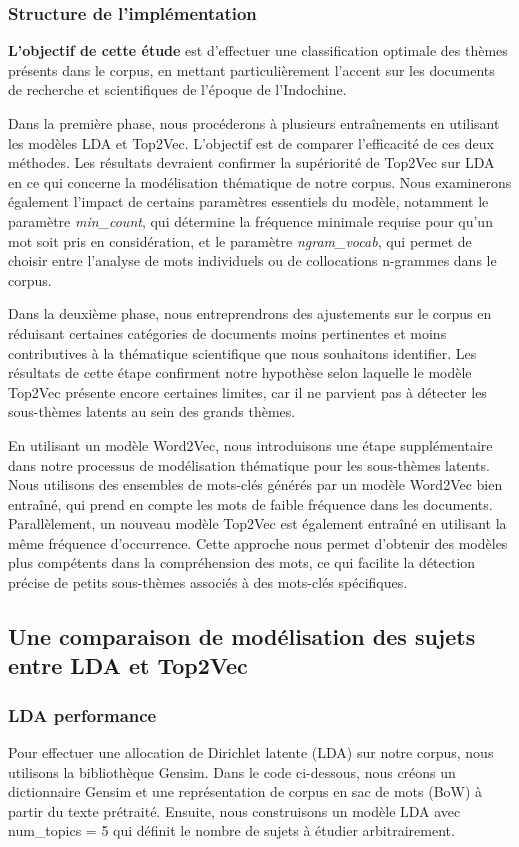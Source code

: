 \subsubsection{Structure de l'implémentation}
\textbf{L'objectif de cette étude} est d'effectuer une classification optimale des thèmes présents dans le corpus, en mettant particulièrement l'accent sur les documents de recherche et scientifiques de l'époque de l'Indochine.

Dans la première phase, nous procéderons à plusieurs entraînements en utilisant les modèles LDA et Top2Vec. L'objectif est de comparer l'efficacité de ces deux méthodes. Les résultats devraient confirmer la supériorité de Top2Vec sur LDA en ce qui concerne la modélisation thématique de notre corpus. Nous examinerons également l'impact de certains paramètres essentiels du modèle, notamment le paramètre \textit{min\_count}, qui détermine la fréquence minimale requise pour qu'un mot soit pris en considération, et le paramètre \textit{ngram\_vocab}, qui permet de choisir entre l'analyse de mots individuels ou de collocations n-grammes dans le corpus.

Dans la deuxième phase, nous entreprendrons des ajustements sur le corpus en réduisant certaines catégories de documents moins pertinentes et moins contributives à la thématique scientifique que nous souhaitons identifier. Les résultats de cette étape confirment notre hypothèse selon laquelle le modèle Top2Vec présente encore certaines limites, car il ne parvient pas à détecter les sous-thèmes latents au sein des grands thèmes.

En utilisant un modèle Word2Vec, nous introduisons une étape supplémentaire dans notre processus de modélisation thématique pour les sous-thèmes latents. Nous utilisons des ensembles de mots-clés générés par un modèle Word2Vec bien entraîné, qui prend en compte les mots de faible fréquence dans les documents. Parallèlement, un nouveau modèle Top2Vec est également entraîné en utilisant la même fréquence d'occurrence. Cette approche nous permet d'obtenir des modèles plus compétents dans la compréhension des mots, ce qui facilite la détection précise de petits sous-thèmes associés à des mots-clés spécifiques.

\subsection{Une comparaison de modélisation des sujets entre LDA et Top2Vec}
\subsubsection{LDA performance}
Pour effectuer une allocation de Dirichlet latente (LDA) sur notre corpus, nous utilisons la bibliothèque Gensim. Dans le code ci-dessous, nous créons un dictionnaire Gensim et une représentation de corpus en sac de mots (BoW) à partir du texte prétraité. Ensuite, nous construisons un modèle LDA avec num\_topics = 5 qui définit le nombre de sujets à étudier arbitrairement.

